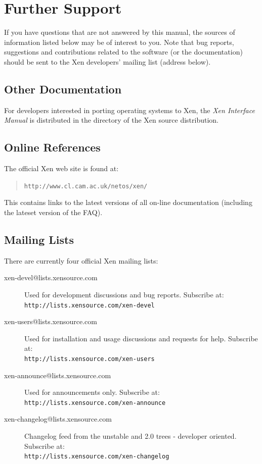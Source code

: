 \documentclass[11pt,twoside,final,openright]{report}
\begin{document}
{\chapter{Further Support}

If you have questions that are not answered by this manual, the
sources of information listed below may be of interest to you.  Note
that bug reports, suggestions and contributions related to the
software (or the documentation) should be sent to the Xen developers'
mailing list (address below).

\section{Other Documentation}

For developers interested in porting operating systems to Xen, the
{\em Xen Interface Manual} is distributed in the 
directory of the Xen source distribution.  


\section{Online References}

The official Xen web site is found at:
\begin{quote}
{\tt http://www.cl.cam.ac.uk/netos/xen/}
\end{quote}

This contains links to the latest versions of all on-line 
documentation (including the lateset version of the FAQ). 

\section{Mailing Lists}

There are currently four official Xen mailing lists:

\begin{description}
\item[xen-devel@lists.xensource.com] Used for development
discussions and bug reports.  Subscribe at: \\
{\small {\tt http://lists.xensource.com/xen-devel}}
\item[xen-users@lists.xensource.com] Used for installation and usage
discussions and requests for help.  Subscribe at: \\
{\small {\tt http://lists.xensource.com/xen-users}}
\item[xen-announce@lists.xensource.com] Used for announcements only.
Subscribe at: \\
{\small {\tt http://lists.xensource.com/xen-announce}}
\item[xen-changelog@lists.xensource.com]  Changelog feed
from the unstable and 2.0 trees - developer oriented.  Subscribe at: \\
{\small {\tt http://lists.xensource.com/xen-changelog}}
\end{description}


}
\end{document}
